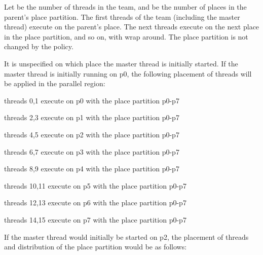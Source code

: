 Let  be the number of threads in the team, and  be the number of places in the 
parent's place partition. The first  threads of the team (including the master 
thread) execute on the parent's place. The next  threads execute on the next 
place in the place partition, and so on, with wrap around. The place partition 
is not changed by the  policy.



It is unspecified on which place the master thread is initially started. If the 
master thread is initially running on p0, the following placement of threads will 
be applied in the parallel region:

\begin{compactitem}
\item threads 0,1 execute on p0 with the place partition p0-p7

\item threads 2,3 execute on p1 with the place partition p0-p7

\item threads 4,5 execute on p2 with the place partition p0-p7

\item threads 6,7 execute on p3 with the place partition p0-p7

\item threads 8,9 execute on p4 with the place partition p0-p7

\item threads 10,11 execute on p5 with the place partition p0-p7

\item threads 12,13 execute on p6 with the place partition p0-p7

\item threads 14,15 execute on p7 with the place partition p0-p7
\end{compactitem}

If the master thread would initially be started on p2, the placement of threads 
and distribution of the place partition would be as follows:

